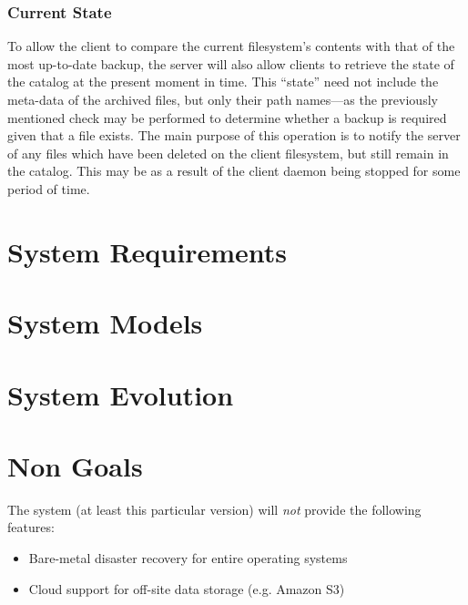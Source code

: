 \subsubsection{Current State}

To allow the client to compare the current filesystem's contents with that of
the most up-to-date backup, the server will also allow clients to retrieve the
state of the catalog at the present moment in time. This ``state'' need not
include the meta-data of the archived files, but only their path names---as the
previously mentioned check may be performed to determine whether a backup is
required given that a file exists. The main purpose of this operation is to
notify the server of any files which have been deleted on the client
filesystem, but still remain in the catalog. This may be as a result of the
client daemon being stopped for some period of time.

\section{System Requirements}

\section{System Models}

\section{System Evolution}

\section{Non Goals}

The system (at least this particular version) will \emph{not} provide the
following features:

\begin{itemize}
    \item Bare-metal disaster recovery for entire operating systems
    \item Cloud support for off-site data storage (e.g. Amazon S3)
\end{itemize}
